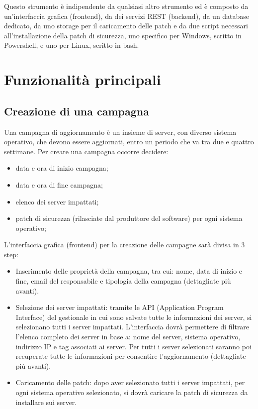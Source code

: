 Questo strumento è indipendente da qualsiasi altro strumento ed è composto
da un’interfaccia grafica (frontend), da dei servizi REST (backend), da
un database dedicato, da uno storage per il caricamento delle patch e da
due script necessari all’installazione della patch di sicurezza, uno 
specifico per Windows, scritto in Powershell, e uno per Linux, scritto 
in bash.


\section{Funzionalità principali}
\subsection{Creazione di una campagna}
Una campagna di aggiornamento è un insieme di server, con diverso sistema 
operativo, che devono essere aggiornati, entro un periodo che va tra due e 
quattro settimane. Per creare una campagna occorre decidere:
\begin{itemize}
\item data e ora di inizio campagna;
\item data e ora di fine campagna;
\item elenco dei server impattati;
\item patch di sicurezza (rilasciate dal produttore del software) per 
ogni sistema operativo;
\end{itemize}
L’interfaccia grafica (frontend) per la creazione delle campagne sarà 
divisa in 3 step:
\begin{itemize}
\item Inserimento delle proprietà della campagna, tra cui: nome, data di 
inizio e fine, email del responsabile e tipologia della campagna 
(dettagliate più avanti).
\item Selezione dei server impattati: tramite le API (Application Program 
Interface) del gestionale in cui sono salvate tutte le informazioni dei 
server, si selezionano tutti i server impattati. L’interfaccia dovrà 
permettere di filtrare l’elenco completo dei server in base a: nome del
server, sistema operativo, indirizzo IP e tag associati ai server. 
Per tutti i server selezionati saranno poi recuperate tutte le informazioni
per consentire l’aggiornamento (dettagliate più avanti).
\item Caricamento delle patch: dopo aver selezionato tutti i server impattati,
per ogni sistema operativo selezionato, si dovrà caricare la patch di sicurezza 
da installare sui server.
\end{itemize}

